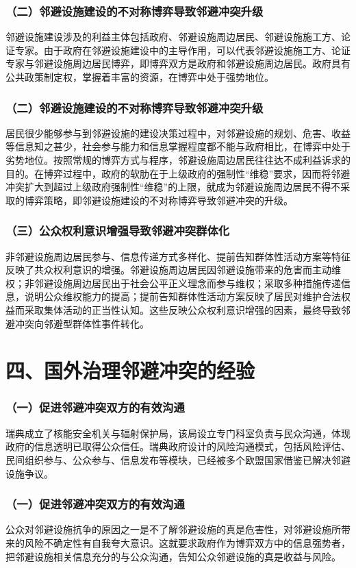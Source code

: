 \documentclass[aspectratio=169, 12pt]{beamer}
\begin{document}
\begin{frame}[plain]
    \frametitle{（二）邻避设施建设的不对称博弈导致邻避冲突升级}
    邻避设施建设涉及的利益主体包括政府、邻避设施周边居民、邻避设施施工方、论证专家。由于政府在邻避设施建设中的主导作用，可以代表邻避设施施工方、论证专家与邻避设施周边居民博弈，即博弈双方是政府和邻避设施周边居民。政府具有公共政策制定权，掌握着丰富的资源，在博弈中处于强势地位。
\end{frame}

\begin{frame}[plain]
    \frametitle{（二）邻避设施建设的不对称博弈导致邻避冲突升级}
    居民很少能够参与到邻避设施的建设决策过程中，对邻避设施的规划、危害、收益等信息知之甚少，社会参与能力和信息掌握程度都不能与政府相比，在博弈中处于劣势地位。按照常规的博弈方式与程序，邻避设施周边居民往往达不成利益诉求的目的。在博弈过程中，政府的软肋在于上级政府的强制性“维稳”要求，因而将邻避冲突扩大到超过上级政府强制性“维稳”的上限，就成为邻避设施周边居民不得不采取的博弈策略，即邻避设施建设的不对称博弈导致邻避冲突的升级。
\end{frame}

\begin{frame}[plain]
    \frametitle{（三）公众权利意识增强导致邻避冲突群体化}
    非邻避设施周边居民参与、信息传递方式多样化、提前告知群体性活动方案等特征反映了共众权利意识的增强。邻避设施周边居民因邻避设施带来的危害而主动维权；非邻避设施周边居民出于社会公平正义理念而参与维权；采取多种措施传递信息，说明公众维权能力的提高；提前告知群体性活动方案反映了居民对维护合法权益而采取集体活动的正当性认知。这些反映公众权利意识增强的因素，最终导致邻避冲突向邻避型群体性事件转化。
\end{frame}

\section{四、国外治理邻避冲突的经验}

\begin{frame}[plain]
    \frametitle{（一）促进邻避冲突双方的有效沟通}
    瑞典成立了核能安全机关与辐射保护局，该局设立专门科室负责与民众沟通，体现政府的信息透明已取得公众信任。瑞典政府设计的风险沟通模式，包括风险评估、民间组织参与、公众参与、信息发布等模块，已经被多个欧盟国家借鉴已解决邻避设施争议。
\end{frame}

\begin{frame}[plain]
    \frametitle{（一）促进邻避冲突双方的有效沟通}
    公众对邻避设施抗争的原因之一是不了解邻避设施的真是危害性，对邻避设施所带来的风险不确定性有自我夸大意识。这就要求政府作为博弈双方中的信息强势者，把邻避设施相关信息充分的与公众沟通，告知公众邻避设施的真是收益与风险。
\end{frame}
\end{document}
